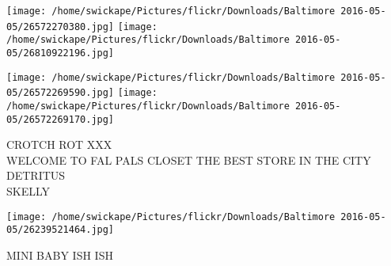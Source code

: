 \documentclass[10pt,letterpaper]{article}
\begin{document}
\texttt{[image: /home/swickape/Pictures/flickr/Downloads/Baltimore 2016-05-05/26572270380.jpg]}
\texttt{[image: /home/swickape/Pictures/flickr/Downloads/Baltimore 2016-05-05/26810922196.jpg]}

\texttt{[image: /home/swickape/Pictures/flickr/Downloads/Baltimore 2016-05-05/26572269590.jpg]}
\texttt{[image: /home/swickape/Pictures/flickr/Downloads/Baltimore 2016-05-05/26572269170.jpg]}

CROTCH ROT XXX\\
WELCOME TO FAL PALS CLOSET THE BEST STORE IN THE CITY\\
DETRITUS\\
SKELLY
\pagebreak

\texttt{[image: /home/swickape/Pictures/flickr/Downloads/Baltimore 2016-05-05/26239521464.jpg]}

MINI BABY ISH ISH
\pagebreak
\end{document}
